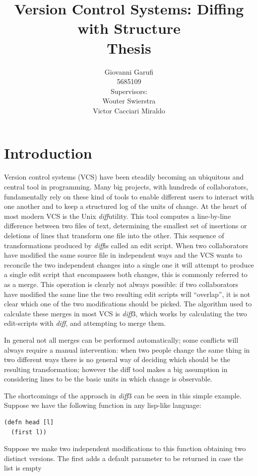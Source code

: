 \documentclass[11pt, titlepage]{article}
\title{Version Control Systems: Diffing with Structure
\\ Thesis}
\author{Giovanni Garufi\\5685109\\[1cm]{Supervisors: \\
    Wouter Swierstra \\
    Victor Cacciari Miraldo}}
\affil{Department of Computing Science\\University of Utrecht}
\newcommand{\diff}{\emph{diff}}
\begin{document}
  


\maketitle
\tableofcontents


\section{Introduction}
Version control systems (VCS) have been steadily becoming an ubiquitous and central 
tool in programming. Many big projects, with hundreds of collaborators, 
fundamentally rely on these kind of tools to enable different users to interact 
with one another and to keep a structured log of the units of change. 
At the heart of most modern VCS is the Unix \diff utility. This tool computes a 
line-by-line difference between two files of text, determining the smallest set 
of insertions or deletions of lines that transform one file into the other. This sequence of transformations produced by \diff is called an edit script. 
When two collaborators have modified the same source file in independent ways and the VCS wants to reconcile the two independent changes into a single one it will attempt to produce a single edit script that encompasses both changes, this is commonly referred to 
as a merge. This operation is clearly not always possible: if two collaborators have modified the same line the two resulting edit scripts will ``overlap'', it is not clear which one of the two modifications should be picked.  The algorithm used to calculate these merges in most VCS is \diff3, which works by calculating the two edit-scripts with \diff, and attempting to merge them.

In general not all merges can be performed automatically; some conflicts will always require a manual intervention: when two 
people change the same thing in two different ways there is no general way of 
deciding which should be the resulting transformation; however the diff tool makes a big assumption in considering lines to be the basic units in which change is observable. 

The shortcomings of the approach in \diff3 can be seen in this simple example.
Suppose we have the following function in any lisp-like language:

\begin{verbatim}
(defn head [l]
  (first l))
\end{verbatim}

Suppose we make two independent modifications to this function obtaining two distinct versions.
The first adds a default parameter to be returned in case the list is empty
\end{document}
